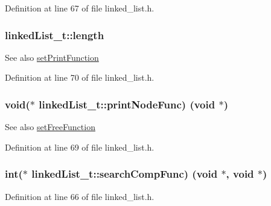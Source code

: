Definition at line 67 of file linked\+\_\+list.\+h.

\subsubsection[{\texorpdfstring{length}{length}}]{ linked\+List\+\_\+t\+::length}\hypertarget{structs__ll_abeb40a7e7b4c71ba09151cde4005c201}{}\label{structs__ll_abeb40a7e7b4c71ba09151cde4005c201}
\begin{DoxySeeAlso}{See also}
\hyperlink{group___r2_gafc8969d7969f61c928a01f4c302e669b}{set\+Print\+Function} 
\end{DoxySeeAlso}


Definition at line 70 of file linked\+\_\+list.\+h.

\subsubsection[{\texorpdfstring{print\+Node\+Func}{printNodeFunc}}]{\setlength{\rightskip}{0pt plus 5cm}void($\ast$ linked\+List\+\_\+t\+::print\+Node\+Func) (void $\ast$)}\hypertarget{structs__ll_ad3b310fea19fca7898583a8c0eb87449}{}\label{structs__ll_ad3b310fea19fca7898583a8c0eb87449}
\begin{DoxySeeAlso}{See also}
\hyperlink{linked__list_8c_a3b6f817f74d12d2cf4a35405f447c73d}{set\+Free\+Function} 
\end{DoxySeeAlso}


Definition at line 69 of file linked\+\_\+list.\+h.

\subsubsection[{\texorpdfstring{search\+Comp\+Func}{searchCompFunc}}]{\setlength{\rightskip}{0pt plus 5cm}int($\ast$ linked\+List\+\_\+t\+::search\+Comp\+Func) (void $\ast$, void $\ast$)}\hypertarget{structs__ll_ac22c97ea79a7ec45eb27584f2f91295c}{}\label{structs__ll_ac22c97ea79a7ec45eb27584f2f91295c}


Definition at line 66 of file linked\+\_\+list.\+h.

